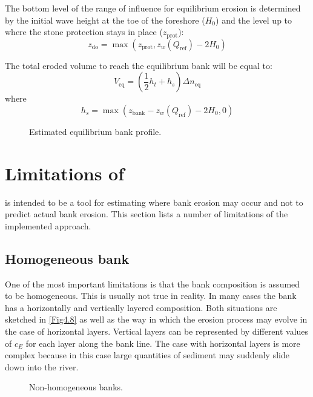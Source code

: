 The bottom level of the range of influence for equilibrium erosion is determined by the initial wave height at the toe of the foreshore ($H_0$) and the level up to where the stone protection stays in place ($z_\text{prot}$):
\begin{equation}
z_\text{do} = \max (z_\text{prot}, z_w(Q_\text{ref}) - 2 H_0 )
\end{equation}	

The total eroded volume to reach the equilibrium bank will be equal to:
\begin{equation}
V_\text{eq} = ( \frac{1}{2} h_t + h_s ) \Delta n_\text{eq}
\end{equation}
where 
\begin{equation}
h_s = \max ( z_\text{bank} - z_w(Q_\text{ref}) - 2 H_0, 0)
\end{equation}

\begin{figure}[!h]
\center
\resizebox{14cm}{!}{
   
}
\caption{Estimated equilibrium bank profile.}
\label{Fig4.7}
\end{figure}

\section{Limitations of \dfastbe} \label{Sec4.7}

\dfastbe is intended to be a tool for estimating where bank erosion may occur and not to predict actual bank erosion.
This section lists a number of limitations of the implemented approach.

\subsection{Homogeneous bank}

One of the most important limitations is that the bank composition is assumed to be homogeneous.
This is usually not true in reality.
In many cases the bank has a horizontally and vertically layered composition.
Both situations are sketched in \autoref{Fig4.8} as well as the way in which the erosion process may evolve in the case of horizontal layers.
Vertical layers can be represented by different values of $c_E$ for each layer along the bank line.
The case with horizontal layers is more complex because in this case large quantities of sediment may suddenly slide down into the river.

\begin{figure}
\center
\center
\resizebox{13cm}{!}{
   
}
\caption{Non-homogeneous banks.}
\label{Fig4.8}
\end{figure}

